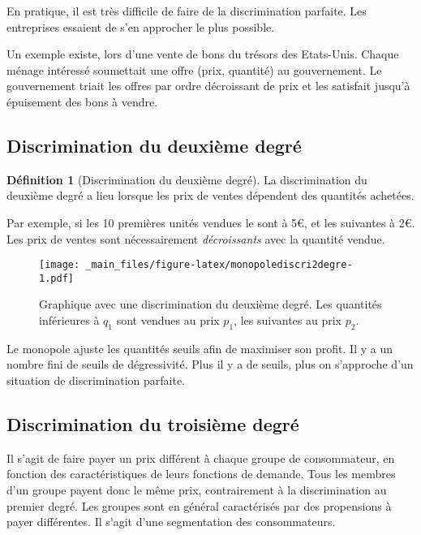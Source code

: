 \documentclass[
]{book}
\theoremstyle{definition}
\newtheorem{definition}{Définition}[chapter]
\theoremstyle{definition}
\theoremstyle{definition}
\theoremstyle{definition}
\theoremstyle{remark}
\begin{document}
En pratique, il est très difficile de faire de la discrimination parfaite.
Les entreprises essaient de s'en approcher le plus possible.

Un exemple existe, lors d'une vente de bons du trésors des Etats-Unis.
Chaque ménage intéressé soumettait une offre (prix, quantité) au gouvernement.
Le gouvernement triait les offres par ordre décroissant de prix et les satisfait jusqu'à épuisement des bons à vendre.

\hypertarget{discrimination-du-deuxiuxe8me-degruxe9}{%
\subsection{Discrimination du deuxième degré}\label{discrimination-du-deuxiuxe8me-degruxe9}}

\begin{definition}[Discrimination du deuxième degré]
La discrimination du deuxième degré a lieu lorsque les prix de ventes dépendent des quantités achetées.
\end{definition}

Par exemple, si les 10 premières unités vendues le sont à 5€, et les suivantes à 2€.
Les prix de ventes sont nécessairement \emph{décroissants} avec la quantité vendue.

\begin{figure}
\centering
\texttt{[image: \_main\_files/figure-latex/monopolediscri2degre-1.pdf]}
\caption{\label{fig:monopolediscri2degre}Graphique avec une discrimination du deuxième degré. Les quantités inférieures à \(q_1\) sont vendues au prix \(p_1\), les suivantes au prix \(p_2\).}
\end{figure}

Le monopole ajuste les quantités seuils afin de maximiser son profit.
Il y a un nombre fini de seuils de dégressivité.
Plus il y a de seuils, plus on s'approche d'un situation de discrimination parfaite.

\hypertarget{discrimination-du-troisiuxe8me-degruxe9}{%
\subsection{Discrimination du troisième degré}\label{discrimination-du-troisiuxe8me-degruxe9}}

Il s'agit de faire payer un prix différent à chaque groupe de consommateur, en fonction des caractéristiques de leurs fonctions de demande.
Tous les membres d'un groupe payent donc le même prix, contrairement à la discrimination au premier degré.
Les groupes sont en général caractérisés par des propensions à payer différentes.
Il s'agit d'une segmentation des consommateurs.
\end{document}
